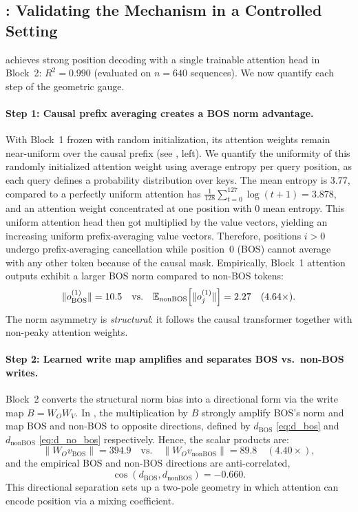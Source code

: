 \documentclass{article}
\theoremstyle{plain}
\theoremstyle{definition}
\theoremstyle{remark}
\begin{document}
\subsection{\modelminimal: Validating the Mechanism in a Controlled Setting}
\label{subsec:minimal_evidence}

\modelminimal achieves strong position decoding with a single trainable attention head in Block~2: $R^2=0.990$ (evaluated on $n=640$ sequences).
We now quantify each step of the geometric gauge.

\paragraph{Step 1: Causal prefix averaging creates a BOS norm advantage.}
With Block~1 frozen with random initialization, its attention weights remain near-uniform over the causal prefix (see , left).
We quantify the uniformity of this randomly initialized attention weight using average entropy per query position, as each query defines a probability distribution over keys.
The mean entropy is 3.77, compared to a perfectly uniform attention has \(\frac{1}{128}\sum_{t=0}^{127}\log(t+1) = 3.878\), and an attention weight concentrated at one position with 0 mean entropy.
This uniform attention head then got multiplied by the value vectors, yielding an increasing uniform prefix-averaging value vectors.
Therefore, positions $i>0$ undergo prefix-averaging cancellation while position~0 (BOS) cannot average with any other token because of the causal mask.
Empirically, Block~1 attention outputs exhibit a larger BOS norm compared to non-BOS tokens:
\[
\|o^{(1)}_{\text{BOS}}\|=10.5
\quad\text{vs.}\quad
\mathbb{E}_{\text{nonBOS}}\!\left[\|o^{(1)}_j\|\right]=2.27
\quad (4.64\times).
\]
The norm asymmetry is \emph{structural}: it follows the causal transformer together with non-peaky attention weights.


\paragraph{Step 2: Learned write map amplifies and separates BOS vs.\ non-BOS writes.}
Block~2 converts the structural norm bias into a directional form via the write map $B=W_O W_V$.
In , the multiplication by $B$ strongly amplify BOS's norm and map BOS and non-BOS to opposite directions, defined by $d_{\text{BOS}}$ \eqref{eq:d_bos} and $d_{\text{nonBOS}}$ \eqref{eq:d_no_bos} respectively.
Hence, the scalar products are:
\[
\|W_O v_{\text{BOS}}\|=394.9
\quad\text{vs.}\quad
\|W_O v_{\text{nonBOS}}\|=89.8
\quad (4.40\times),
\]
and the empirical BOS and non-BOS directions are anti-correlated,
\[
\cos(d_{\text{BOS}}, d_{\text{nonBOS}})=-0.660.
\]
This directional separation sets up a two-pole geometry in which attention can encode position via a mixing coefficient.
\end{document}
